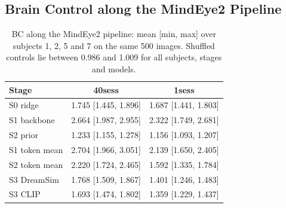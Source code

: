 \documentclass[11pt,a4paper]{article}
\begin{document}
\subsection{Brain Control along the MindEye2 Pipeline}
\label{sec:nsd-stages}

\begin{table}[tbp]
\centering
\caption{BC along the MindEye2 pipeline: mean [min, max] over subjects 1, 2, 5
  and 7 on the same 500 images. Shuffled controls lie between 0.986 and 1.009 for
  all subjects, stages and models.}
\label{tab:stages}
\small
\begin{tabular}{lcc}
\toprule
Stage & 40sess & 1sess \\
\midrule
S0 ridge                      & 1.745 [1.445, 1.896] & 1.687 [1.441, 1.803] \\
S1 backbone                   & 2.664 [1.987, 2.955] & 2.322 [1.749, 2.681] \\
S2 prior                      & 1.233 [1.155, 1.278] & 1.156 [1.093, 1.207] \\
S1 token mean                 & 2.704 [1.966, 3.051] & 2.139 [1.650, 2.405] \\
S2 token mean                 & 2.220 [1.724, 2.465] & 1.592 [1.335, 1.784] \\
S3 DreamSim                   & 1.768 [1.509, 1.867] & 1.401 [1.246, 1.483] \\
S3 CLIP                       & 1.693 [1.474, 1.802] & 1.359 [1.229, 1.437] \\
\bottomrule
\end{tabular}
\end{table}
\end{document}
